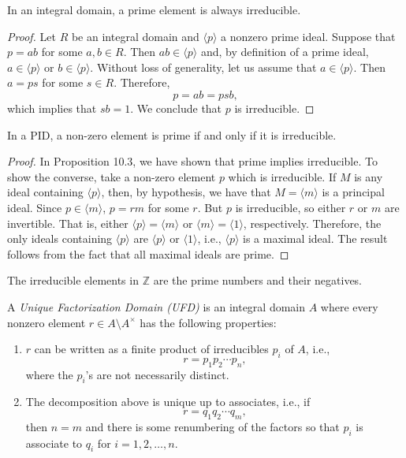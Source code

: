 \documentclass[11pt,a4paper]{article}
\begin{document}
\begin{prop}[10.3]
In an integral domain, a prime element is always irreducible.
\end{prop}

\begin{proof}
Let $R$ be an integral domain and $\langle p \rangle$ a nonzero prime ideal. Suppose that $p = ab$ for some $a, b \in R$. Then $ab \in \langle p \rangle$ and, by definition of a prime ideal, $a \in \langle p \rangle$ or $b \in \langle p \rangle$. Without loss of generality, let us assume that $a \in \langle p \rangle$. Then $a = ps$ for some $s \in R$. Therefore,
\[
p = ab = psb,
\]
which implies that $sb = 1$. We conclude that $p$ is irreducible.
\end{proof}

\begin{prop}[10.4]
    In a PID, a non-zero element is prime if and only if it is irreducible.
    \end{prop}
    
    \begin{proof}
    In Proposition 10.3, we have shown that prime implies irreducible. To show the converse, take a non-zero element $p$ which is irreducible. If $M$ is any ideal containing $\langle p \rangle$, then, by hypothesis, we have that $M = \langle m \rangle$ is a principal ideal. Since $p \in \langle m \rangle$, $p = rm$ for some $r$. But $p$ is irreducible, so either $r$ or $m$ are invertible. That is, either $\langle p \rangle = \langle m \rangle$ or $\langle m \rangle = \langle 1 \rangle$, respectively. Therefore, the only ideals containing $\langle p \rangle$ are $\langle p \rangle$ or $\langle 1 \rangle$, i.e., $\langle p \rangle$ is a maximal ideal. The result follows from the fact that all maximal ideals are prime.
    \end{proof}
    
    \begin{exa}[10.6]
    The irreducible elements in $\mathbb{Z}$ are the prime numbers and their negatives.
    \end{exa}
    
    A \textit{Unique Factorization Domain (UFD)} is an integral domain $A$ where every nonzero element $r \in A \setminus A^\times$ has the following properties:
    \begin{enumerate}[label=(\roman*)]
        \item $r$ can be written as a finite product of irreducibles $p_i$ of $A$, i.e.,
        \[
        r = p_1 p_2 \cdots p_n,
        \]
        where the $p_i$'s are not necessarily distinct.
        \item The decomposition above is unique up to associates, i.e., if
        \[
        r = q_1 q_2 \cdots q_m,
        \]
        then $n = m$ and there is some renumbering of the factors so that $p_i$ is associate to $q_i$ for $i = 1, 2, \dots, n$.
    \end{enumerate}
    
\end{document}
